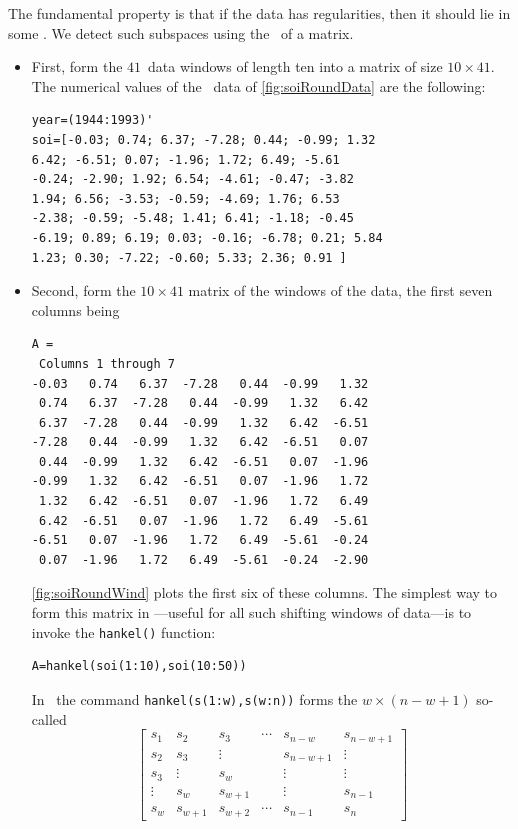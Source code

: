 \begin{example}
The fundamental property is that if the data has regularities, then it should lie in some .
We detect such subspaces using the \svd\ of a matrix.
\begin{itemize}
\item First, form the \(41\)~data windows of length ten into a matrix of size \(10\times 41\).
The numerical values of the \soi\ data of \cref{fig:soiRoundData} are the following:
\begin{verbatim}
year=(1944:1993)'
soi=[-0.03; 0.74; 6.37; -7.28; 0.44; -0.99; 1.32
6.42; -6.51; 0.07; -1.96; 1.72; 6.49; -5.61
-0.24; -2.90; 1.92; 6.54; -4.61; -0.47; -3.82
1.94; 6.56; -3.53; -0.59; -4.69; 1.76; 6.53
-2.38; -0.59; -5.48; 1.41; 6.41; -1.18; -0.45
-6.19; 0.89; 6.19; 0.03; -0.16; -6.78; 0.21; 5.84
1.23; 0.30; -7.22; -0.60; 5.33; 2.36; 0.91 ] 
\end{verbatim}

\item Second, form the \(10\times41\) matrix of the windows of the data, the first seven columns being
\begin{verbatim}
A =
 Columns 1 through 7
-0.03   0.74   6.37  -7.28   0.44  -0.99   1.32
 0.74   6.37  -7.28   0.44  -0.99   1.32   6.42
 6.37  -7.28   0.44  -0.99   1.32   6.42  -6.51
-7.28   0.44  -0.99   1.32   6.42  -6.51   0.07
 0.44  -0.99   1.32   6.42  -6.51   0.07  -1.96
-0.99   1.32   6.42  -6.51   0.07  -1.96   1.72
 1.32   6.42  -6.51   0.07  -1.96   1.72   6.49
 6.42  -6.51   0.07  -1.96   1.72   6.49  -5.61
-6.51   0.07  -1.96   1.72   6.49  -5.61  -0.24
 0.07  -1.96   1.72   6.49  -5.61  -0.24  -2.90
\end{verbatim}
\cref{fig:soiRoundWind} plots the first six of these columns.
The simplest way to form this matrix in \script---useful for all such shifting windows of data---is to invoke the \verb|hankel()| function:
\begin{verbatim}
A=hankel(soi(1:10),soi(10:50))
\end{verbatim}
In \script\ the command \verb|hankel(s(1:w),s(w:n))| forms the \(w\times(n-w+1)\) so-called 
\begin{equation*}
\begin{bmatrix} s_1&s_2&s_3&\cdots&s_{n-w}&s_{n-w+1}
\\s_2&s_3&\vdots&&s_{n-w+1}&\vdots
\\s_3&\vdots&s_w&&\vdots&\vdots
\\\vdots&s_w&s_{w+1}&&\vdots&s_{n-1}
\\s_w&s_{w+1}&s_{w+2}&\cdots&s_{n-1}&s_n \end{bmatrix}
\end{equation*}


\end{itemize}
\end{example}
